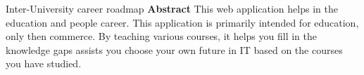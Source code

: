 \newpage
\pagestyle{plain}

\begin{center}
    \Large
    Inter-University career roadmap
    \textbf{Abstract}
    This web application helps in the education and people career. This application is primarily intended for education, only then commerce. By teaching various courses, it helps you fill in the knowledge gaps assists you choose your own future in IT based on the courses you have studied.
\end{center}

\blindtext %
